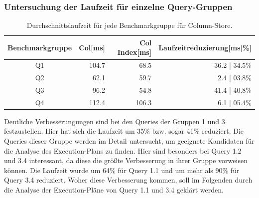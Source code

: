 \subsubsection{Untersuchung der Laufzeit für einzelne Query-Gruppen}

\begin{table}[H]
    \centering
    \begin{tabularx}{\linewidth}{crrr}
        \toprule
        Benchmarkgruppe & Col[ms]   & Col Index[ms] & Laufzeitreduzierung[ms|\%]\\
        \toprule
        Q1              & 104.7       & 68.5            & 36.2 | 34.5\%\\
        Q2              & 62.1        & 59.7            & 2.4 |  03.8\%\\
        Q3              & 96.2        & 54.8            & 41.4 | 40.8\%\\
        Q4              & 112.4       & 106.3           & 6.1 |  05.4\%\\
        \bottomrule
    \end{tabularx}
	\caption{Durchschnittslaufzeit für jede Benchmarkgruppe für Column-Store.}
\end{table}

Deutliche Verbesserungungen sind bei den Queries der Gruppen 1 und 3 festzustellen. Hier hat sich die Laufzeit um 35\% bzw. sogar 41\% reduziert. 
Die Queries dieser Gruppe werden im Detail untersucht, um geeignete Kandidaten für die Analyse des Execution-Plans zu finden.
Hier sind besonders bei Query 1.2 und 3.4 interessant, da diese die größte Verbesserung in ihrer Gruppe vorweisen können. 
Die Laufzeit wurde um 64\% für Query 1.1 und um mehr als 90\% für Query 3.4 reduziert. Woher diese Verbesserung kommen, soll im Folgenden durch die Analyse der Execution-Pläne von Query 1.1 und 3.4 geklärt werden.


